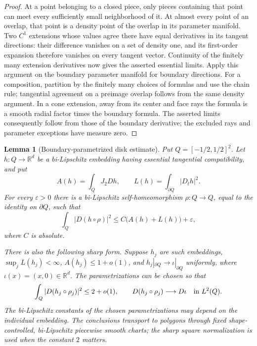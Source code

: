 \documentclass[11pt]{article}
\numberwithin{equation}{section}
\newtheorem{lemma}[theorem]{Lemma}
\theoremstyle{definition}
\theoremstyle{remark}
\begin{document}
\begin{proof}
At a point belonging to a closed piece, only pieces containing that
point can meet every sufficiently small neighborhood of it.  At almost
every point of an overlap, that point is a density point of the overlap
in its parameter manifold.  Two $C^1$ extensions whose values agree
there have equal derivatives in its tangent directions: their difference
vanishes on a set of density one, and its first-order expansion therefore
vanishes on every tangent vector.  Continuity of the finitely many
extension derivatives now gives the asserted essential limits.
Apply this argument on the boundary parameter manifold for boundary
directions.  For a composition, partition by the finitely many choices
of formulas and use the chain rule; tangential agreement on a preimage
overlap follows from the same density argument.  In a cone extension,
away from its center and face rays the formula is a smooth radial
factor times the boundary formula.  The asserted limits consequently
follow from those of the boundary derivative; the excluded rays and
parameter exceptions have measure zero.
\end{proof}

\begin{lemma}[Boundary-parametrized disk estimate]
\label{lt:disk}
Put $Q=[-1/2,1/2]^2$.  Let $h:Q\to\mathbb R^d$ be a bi-Lipschitz embedding
having essential tangential compatibility, and put
\[
 A(h)=\int_Q J_2Dh,\qquad
 L(h)=\int_{\partial Q}|D_t h|^2.
\]
For every $\varepsilon>0$ there is a bi-Lipschitz self-homeomorphism
$\rho:Q\to Q$, equal to the identity on $\partial Q$, such that
\begin{equation}
 \int_Q|D(h\circ\rho)|^2
       \leq C\bigl(A(h)+L(h)\bigr)+\varepsilon,
 \label{lt:disk-weak}
\end{equation}
where $C$ is absolute.

There is also the following sharp form.  Suppose $h_j$ are such
embeddings, $\sup_jL(h_j)<\infty$,
$A(h_j)\leq1+o(1)$, and
$h_j|_{\partial Q}\to\iota|_{\partial Q}$ uniformly, where
$\iota(x)=(x,0)\in\mathbb R^d$.  The parametrizations can be chosen so that
\begin{equation}
 \int_Q|D(h_j\circ\rho_j)|^2\leq2+o(1),
 \qquad
 D(h_j\circ\rho_j)\longrightarrow D\iota
       \quad\hbox{in }L^2(Q).
 \label{lt:disk-sharp}
\end{equation}
The bi-Lipschitz constants of the chosen parametrizations may depend on
the individual embedding.  The conclusions transport to polygons
through fixed shape-controlled, bi-Lipschitz piecewise smooth charts;
the sharp square normalization is used when the constant $2$ matters.
\end{lemma}
\end{document}
